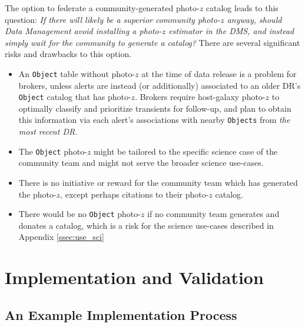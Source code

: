 \documentclass[DM,lsstdraft,toc]{lsstdoc}
\begin{document}
The option to federate a community-generated photo-$z$ catalog leads to this question: {\it If there will likely be a superior community photo-$z$ anyway, should Data Management avoid installing a photo-$z$ estimator in the DMS, and instead simply wait for the community to generate a catalog?}
There are several significant risks and drawbacks to this option.
\vspace{-15pt}
\begin{itemize}
\item An {\tt Object} table without photo-$z$ at the time of data release is a problem for brokers, unless alerts are instead (or additionally) associated to an older DR's {\tt Object} catalog that has photo-$z$. Brokers require host-galaxy photo-$z$ to optimally classify and prioritize transients for follow-up, and plan to obtain this information via each alert's associations with nearby {\tt Objects} from {\it the most recent DR}.
\item The {\tt Object} photo-$z$ might be tailored to the specific science case of the community team and might not serve the broader science use-cases.
\item There is no initiative or reward for the community team which has generated the photo-$z$, except perhaps citations to their photo-$z$ catalog.
\item There would be no {\tt Object} photo-$z$ if no community team generates and donates a catalog, which is a risk for the science use-cases described in Appendix \ref{ssec:use_sci}
\end{itemize}



\clearpage
\section{Implementation and Validation}\label{sec:imp}

\subsection{An Example Implementation Process}\label{ssec:imp_imp}
\end{document}
